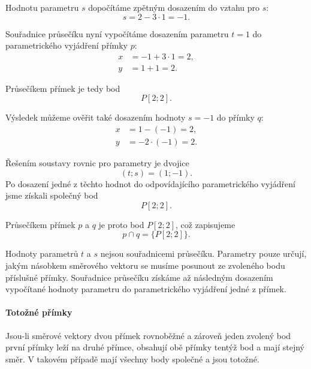 \begin{example}
    Hodnotu parametru $s$ dopočítáme zpětným dosazením do vztahu pro $s$:
    \[
        s=2-3\cdot1=-1.
    \]

    Souřadnice průsečíku nyní vypočítáme dosazením parametru $t=1$
    do parametrického vyjádření přímky $p$:
    \begin{align*}
        x &= -1+3\cdot1=2,\\
        y &= 1+1=2.
    \end{align*}

    Průsečíkem přímek je tedy bod
    \[
        P[2;2].
    \]

    Výsledek můžeme ověřit také dosazením hodnoty $s=-1$ do přímky $q$:
    \begin{align*}
        x &= 1-(-1)=2,\\
        y &= -2\cdot(-1)=2.
    \end{align*}

    Řešením soustavy rovnic pro parametry je dvojice
    \[
        (t;s)=(1;-1).
    \]
    Po dosazení jedné z těchto hodnot do odpovídajícího parametrického
    vyjádření jsme získali společný bod
    \[
        P[2;2].
    \]

    Průsečíkem přímek $p$ a $q$ je proto bod $P[2;2]$, což zapisujeme
    \[
        p\cap q=\{P[2;2]\}.
    \]
    
\end{example}

\begin{remark}\label{rem:Parameters_are_not_intersection_coordinates}
    Hodnoty parametrů $t$ a $s$ nejsou souřadnicemi průsečíku.
    Parametry pouze určují, jakým násobkem směrového vektoru se musíme
    posunout ze zvoleného bodu příslušné přímky. Souřadnice průsečíku
    získáme až následným dosazením vypočítané hodnoty parametru do
    parametrického vyjádření jedné z přímek.
\end{remark}

\paragraph{Totožné přímky}

Jsou-li směrové vektory dvou přímek rovnoběžné a zároveň jeden zvolený
bod první přímky leží na druhé přímce, obsahují obě přímky tentýž bod
a mají stejný směr. V takovém případě mají všechny body společné a jsou
totožné.

